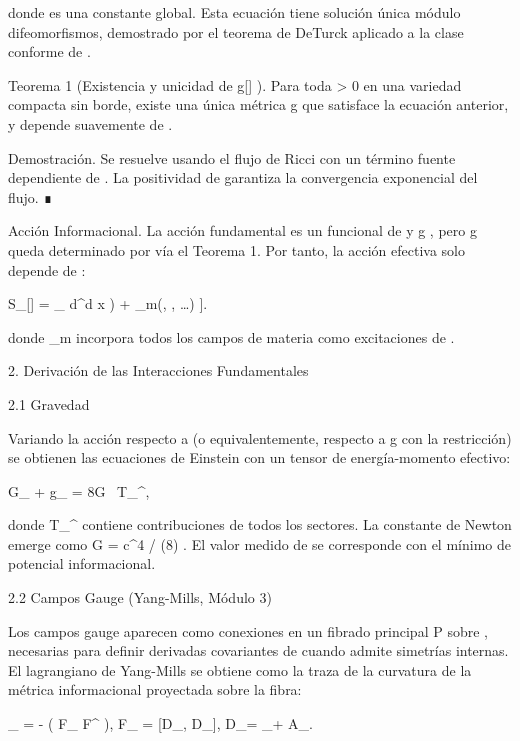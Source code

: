 \documentclass[12pt,a4paper]{book}
\begin{document}
donde  \Lambda  es una constante global. Esta ecuación tiene solución única módulo difeomorfismos, demostrado por el teorema de DeTurck aplicado a la clase conforme de  \rho .

Teorema 1 (Existencia y unicidad de  g[\rho] ). Para toda  \rho > 0  en una variedad compacta sin borde, existe una única métrica  g  que satisface la ecuación anterior, y depende suavemente de  \rho .

Demostración. Se resuelve usando el flujo de Ricci con un término fuente dependiente de  \rho . La positividad de  \rho  garantiza la convergencia exponencial del flujo. ∎

Acción Informacional. La acción fundamental es un funcional de  \rho  y  g , pero  g  queda determinado por  \rho  vía el Teorema 1. Por tanto, la acción efectiva solo depende de  \rho :

S_{}[\rho] = \int_ d^d x  \left[ \frac{1}{2\kappa} R(g[\rho]) + _m(\rho, \nabla\rho, \dots) \right].

donde  _m  incorpora todos los campos de materia como excitaciones de  \rho .

2. Derivación de las Interacciones Fundamentales

2.1 Gravedad

Variando la acción respecto a  \rho  (o equivalentemente, respecto a  g  con la restricción) se obtienen las ecuaciones de Einstein con un tensor de energía-momento efectivo:

G_{\mu\nu} + \Lambda g_{\mu\nu} = 8\pi G \, T_{\mu\nu}^{},

donde  T_{\mu\nu}^{}  contiene contribuciones de todos los sectores. La constante de Newton emerge como  G = \kappa c^4 / (8\pi \hbar) . El valor medido de  \Lambda  se corresponde con el mínimo de potencial informacional.

2.2 Campos Gauge (Yang-Mills, Módulo 3)

Los campos gauge aparecen como conexiones en un fibrado principal  P  sobre   , necesarias para definir derivadas covariantes de  \rho  cuando    admite simetrías internas. El lagrangiano de Yang-Mills se obtiene como la traza de la curvatura de la métrica informacional proyectada sobre la fibra:

_{} = -  \left( F_{\mu\nu} F^{\mu\nu} \right), \quad F_{\mu\nu} = [D_\mu, D_\nu], \quad D_\mu = \nabla_\mu + A_\mu.
\end{document}
